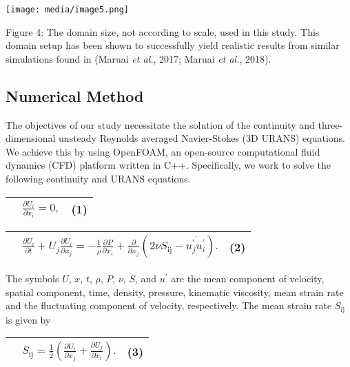 \documentclass[]{article}
\begin{document}
\texttt{[image: media/image5.png]}

\protect\hypertarget{_Ref520289508}{}{\protect\hypertarget{_Toc520544689}{}{\protect\hypertarget{_Toc41048827}{}{}}}Figure
4: The domain size, not according to scale, used in this study. This
domain setup has been shown to successfully yield realistic results from
similar simulations found in (Maruai \emph{et al.}, 2017; Maruai
\emph{et al.}, 2018).

\hypertarget{numerical-method}{\subsection{Numerical
Method}\label{numerical-method}}

The objectives of our study necessitate the solution of the continuity
and three-dimensional unsteady Reynolds averaged Navier-Stokes (3D
URANS) equations. We achieve this by using OpenFOAM, an open-source
computational fluid dynamics (CFD) platform written in C++.
Specifically, we work to solve the following continuity and URANS
equations.

\begin{longtable}[]{@{}lll@{}}
\toprule
& \(\frac{\partial U_{i}}{\partial x_{i}} = 0,\) &
\protect\hypertarget{_Ref41041729}{}{}(1)\tabularnewline
\midrule
\endhead
\bottomrule
\end{longtable}

\begin{longtable}[]{@{}lll@{}}
\toprule
&
\(\frac{\partial U_{i}}{\partial t} + U_{j}\frac{\partial U_{i}}{\partial x_{j}} = - \frac{1}{\rho}\frac{\partial P}{\partial x_{i}} + \frac{\partial}{\partial x_{j}}\left( 2\nu S_{\text{ij}} - \overset{\overline{}}{u_{j}^{'}u_{i}^{'}} \right).\)
& \protect\hypertarget{_Ref41041747}{}{}(2)\tabularnewline
\midrule
\endhead
\bottomrule
\end{longtable}

The symbols \(U\), \(x\), \(t\), \(\rho\), \(P\), \(\nu\), \(S\), and
\(u^{'}\) are the mean component of velocity, spatial component, time,
density, pressure, kinematic viscosity, mean strain rate and the
fluctuating component of velocity, respectively. The mean strain rate
\(S_{\text{ij}}\) is given by

\begin{longtable}[]{@{}lll@{}}
\toprule
&
\(S_{\text{ij}} = \frac{1}{2}\left( \frac{\partial U_{i}}{\partial x_{j}} + \frac{\partial U_{j}}{\partial x_{i}} \right).\)
& (3)\tabularnewline
\midrule
\endhead
\bottomrule
\end{longtable}
\end{document}

